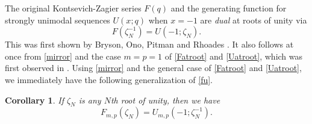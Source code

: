 \documentclass[11pt,reqno]{amsart}
\newtheorem{corollary}[theorem]{Corollary}
\theoremstyle{definition}
\numberwithin{equation}{section}
\begin{document}
The original Kontsevich-Zagier series $F(q)$ and the generating function for strongly unimodal sequences $U(x;q)$ when $x=-1$ are \emph{dual} at roots of unity via
\begin{equation} \label{fu}
F(\zeta_N^{-1}) = U(-1; \zeta_N).
\end{equation}
This was first shown by Bryson, Ono, Pitman and Rhoades \cite{bopr}.   It also
follows at once from \eqref{mirror} and the case $m=p=1$ of \eqref{Fatroot} and \eqref{Uatroot}, which was first observed in \cite{hl1}. Using \eqref{mirror} and the general case of \eqref{Fatroot} and \eqref{Uatroot}, we immediately have the following generalization of \eqref{fu}.

\begin{corollary} \label{fugeneralthm} If $\zeta_N$ is any $N$th root of unity, then we have
\begin{equation} \label{fugeneraleq}
F_{m,p}(\zeta_N) = U_{m,p}(-1; \zeta_N^{-1}).
\end{equation} 
\end{corollary}
\end{document}
